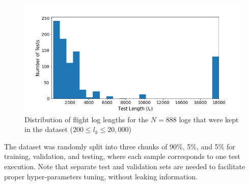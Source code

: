 \begin{figure}
    \centering
    \includegraphics[width=\columnwidth]{ASE_files/test_lengths.png}
    \caption{Distribution of flight log lengths for the $N=888$ logs that were kept in the dataset ($200 \leq l_k \leq 20,000$)}
    \label{fig:test_lengths}
\end{figure}

The dataset was randomly split into three chunks of 90\%, 5\%, and 5\% for training, validation, and testing, where each sample corresponds to one test execution. Note that separate test and validation sets are needed to facilitate proper hyper-parameters tuning, without leaking information. 


